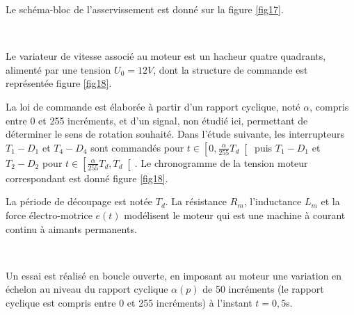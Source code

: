 \newpage

Le schéma-bloc de l’asservissement est donné sur la figure \ref{fig17}.



~\

Le variateur de vitesse associé au moteur est un hacheur quatre quadrants, alimenté par une tension $U_0=12V$, dont la structure de commande est représentée figure \ref{fig18}.

La loi de commande est élaborée à partir d’un rapport cyclique, noté $\alpha$, compris entre 0 et 255 incréments, et d’un signal, non étudié ici, permettant de déterminer le sens de rotation souhaité. Dans l’étude suivante, les interrupteurs $T_1-D_1$ et $T_4-D_4$ sont commandés pour $t\in \left[0,\frac{\alpha}{255}T_d\right[$ puis $T_1-D_1$ et $T_2-D_2$ pour $t\in \left[\frac{\alpha}{255}T_d,T_d\right[$. Le chronogramme de la tension moteur correspondant est donné figure \ref{fig18}.


La période de découpage est notée $T_d$. La résistance $R_m$, l’inductance $L_m$ et la force électro-motrice $e(t)$ modélisent le moteur qui est une machine à courant continu à aimants permanents.





~\

Un essai est réalisé en boucle ouverte, en imposant au moteur une variation en échelon au niveau du rapport cyclique $\alpha(p)$ de 50 incréments (le rapport cyclique est compris entre 0 et 255 incréments) à l’instant $t=0,5$s.

